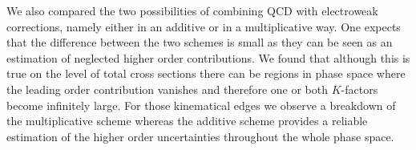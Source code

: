 We also compared the two possibilities of combining QCD with electroweak corrections, namely either in an additive or
in a multiplicative way. One expects that the difference between the two schemes is small as they can be seen as an estimation
of neglected higher order contributions. We found that although this is true on the level of total cross sections there can be 
regions in phase space where the leading order contribution vanishes and therefore one or both $K$-factors become infinitely large. 
For those kinematical edges we observe a breakdown of the multiplicative scheme whereas the additive scheme provides
a reliable estimation of the higher order uncertainties throughout the whole phase space.




